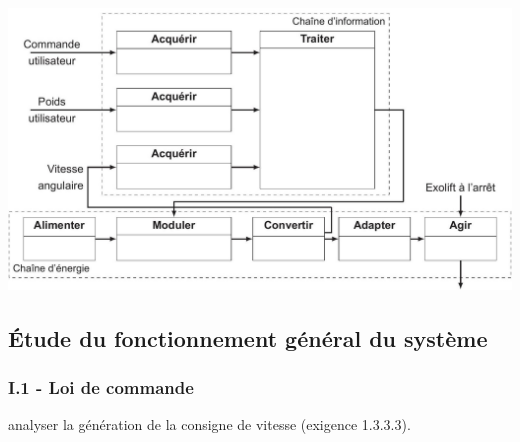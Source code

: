 \ifprof
  {
  \begin{center}
  \includegraphics[width=1.0\textwidth]{images/2023_10_30_d11e80da56f59e3b3cdfg-17}
  \end{center}
  }

\else




\FloatBarrier
\subsection{ Étude du fonctionnement général du système}
\subsubsection{I.1 - Loi de commande}

\begin{objectif}
 analyser la génération de la consigne de vitesse (exigence 1.3.3.3).
\end{objectif}


